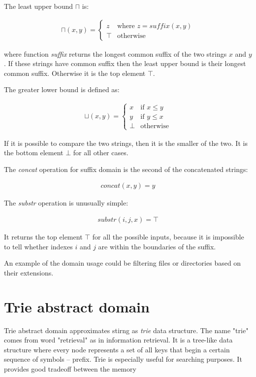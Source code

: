 \documentclass[12pt,final,oneside]{fithesis2}
\theoremstyle{definition}
\begin{document}
The least upper bound $\sqcap$ is:

\begin{align*}
\sqcap (x, y) =
\begin{cases}
z    & \text{where } z = \textit{suffix}(x,  y) \\
\top & \text{otherwise}
\end{cases}
\end{align*}

where function \textit{suffix} returns the longest common suffix of the
two strings $x$ and $y$. If these strings have common suffix then the least
upper bound is their longest common suffix. Otherwise it is the top
element $\top$.

The greater lower bound is defined as:

\begin{align*}
\sqcup (x, y) =
\begin{cases}
x    & \text{if } x \leq y \\
y    & \text{if } y \leq x \\
\bot & \text{otherwise}
\end{cases}
\end{align*}

If it is possible to compare the two strings, then it is the smaller of the
two. It is the bottom element $\bot$ for all other cases.

The \textit{concat} operation for suffix domain is the second of the
concatenated strings:

\begin{align*}
\textit{concat}(x, y) = y
\end{align*}

The \textit{substr} operation is unusually simple:

\begin{align*}
\textit{substr}(i, j, x) = \top
\end{align*}

It returns the top element $\top$ for all the possible inputs, because
it is impossible to tell whether indexes $i$ and $j$ are within the
boundaries of the suffix.

An example of the domain usage could be filtering files or directories
based on their extensions.


\section{Trie abstract domain}

Trie abstract domain approximates stirng as \textit{trie} data structure.
The name "trie" comes from word "retrieval" as in information retrieval. It
is a tree-like data structure where every node represents a set of all keys
that begin a certain sequence of symbols -- prefix. Trie is especially useful
for searching purposes. It provides good tradeoff between the memory
\end{document}

